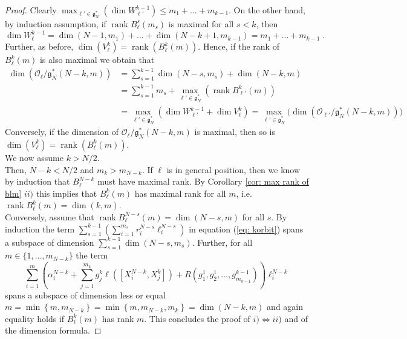 \documentclass[10pt,a4paper]{amsart}
\newcommand{\fancyg}{\mathfrak{g}}
\newcommand{\rank}{\operatorname{rank}}
\begin{document}
\begin{proof}
		Clearly $\max_{\ell' \in \fancyg_{N}^*}\left(\operatorname{dim}W_{\ell'}^{k-1}\right)\leq m_1+\ldots + m_{k-1}$. On the other hand, by induction assumption, if $\operatorname{rank}B_{\ell}^s(m_s)$ is maximal for all $s<k$, then $$\operatorname{dim}W_{\ell}^{k-1} = \operatorname{dim}(N-1,m_1)+\ldots + \operatorname{dim}(N-k+1,m_{k-1})=m_1+\ldots + m_{k-1} \;.$$
		Further, as before, $\dim(V_{\ell}^k) =\operatorname{rank}(B_{\ell}^k(m))$. Hence, if the rank of $B_{\ell}^k(m)$ is also maximal we obtain that
		\begin{align*}
			\operatorname{dim}\left(\mathcal{O}_{\ell} / \fancyg_N^*(N - k, m)\right)
			&= \sum_{s=1}^{k-1}\operatorname{dim}(N-s,m_s)+ \operatorname{dim}(N-k,m)\\
			&= \sum_{s=1}^{k-1}m_s+ \max_{\ell' \in \fancyg_{N}^*}\left(\rank B_{\ell'}^k(m)\right)\\
			&=\max_{\ell' \in \fancyg_{N}^*}\left(\dim W_{\ell'}^{k-1} + \dim V_{\ell}^k\right) = \max_{\ell' \in \fancyg_{N}^*}\big(\operatorname{dim}\left(\mathcal{O}_{\ell'} / \fancyg_N^*(N - k, m)\right) \big)
		\end{align*}
		Conversely, if the dimension of $\mathcal{O}_{\ell} / \fancyg_N^*(N - k, m)$ is maximal, then so is $\dim(V_{\ell}^k) = \operatorname{rank}(B_{\ell}^k(m))$\vspace{5pt}.\\
		We now assume $k>N/2$. \\
		Then, $N-k<N/2$ and $m_k>m_{N-k}$. If $\ell$ is in general position, then we know by induction that $B_{\ell}^{N-k}$ must have maximal rank. By Corollary \ref{cor: max rank of blm} $ii)$ this implies that $B_{\ell}^{k}(m)$ has maximal rank for all $m$, i.e. $\rank B_{\ell}^{k}(m) = \dim(k,m)$.\\
		Conversely, assume that $\operatorname{rank}B_{\ell}^{N-s}(m)=\dim(N-s,m)$ for all $s$. By induction the term $ \sum_{s = 1}^{k-1} \left(\sum_{i=1}^{m_s} r_i^{N-s} \ell_i^{N-s} \right)$ in equation (\ref{eq: korbit}) spans a subspace of dimension $\sum_{s =1}^{k-1}\dim(N-s,m_s)$. Further, for all $m \in \{1, \ldots, m_{N-k}\}$ the term
		\[\sum_{i=1}^{m} \left(\alpha_i^{N-k} + \sum_{j=1}^{m_k} g_j^k \ell([X_i^{N-k}, X_j^k]) + R(g_1^1,g_2^1, \ldots, g_{m_{k-1}}^{k-1})\right) \ell_i^{N-k}\]
		spans a subspace of dimension less or equal $m =\min\left\{m,m_{N-k}\right\} =\min\left\{m,m_{N-k},m_k\right\} = \dim(N-k,m)$ and again equality holds if $B_{\ell}^{k}(m)$ has rank $m$.
		This concludes the proof of $i) \iff ii)$ and of the dimension formula.
	\end{proof}
\end{document}
